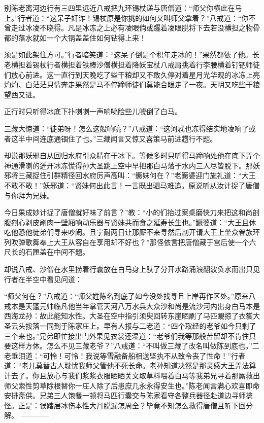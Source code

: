 \documentclass[12pt,UTF8]{ctexbook}
\begin{document}
别陈老离河边行有三四里远近八戒把九环锡杖递与唐僧道：“师父你横此在马上。”行者道：“这呆子奸诈！锡杖原是你挑的如何又叫师父拿着？”八戒道：“你不曾走过冰凌不晓得。凡是冰冻之上必有凌眼倘或躧着凌眼脱将下去若没横担之物骨都的落水就如一个大锅盖盖住如何钻得上来！

须是如此架住方可。”行者暗笑道：“这呆子倒是个积年走冰的！”果然都依了他。长老横担着锡杖行者横担着铁棒沙僧横担着降妖宝杖八戒肩挑着行李腰横着钉钯师徒们放心前进。这一直行到天晚吃了些干粮却又不敢久停对着星月光华观的冰冻上亮灼灼、白茫茫只情奔走果然是马不停蹄师徒们莫能合眼走了一夜。天明又吃些干粮望西又进。

正行时只听得冰底下扑喇喇一声响喨险些儿唬倒了白马。

三藏大惊道：“徒弟呀！怎么这般响喨？”八戒道：“这河忒也冻得结实地凌响了或者这半中间连底通锢住了也。”三藏闻言又惊又喜策马前进趱行不题。

却说那妖邪自从回归水府引众精在于冰下。等候多时只听得马蹄响处他在底下弄个神通滑喇的迸开冰冻慌得孙大圣跳上空中早把那白马落于水内三人尽皆脱下。那妖邪将三藏捉住引群精径回水府厉声高叫：“鳜妹何在？”老鳜婆迎门施礼道：“大王不敢不敢！”妖邪道：“贤妹何出此言！一言既出驷马难追。原说听从汝计捉了唐僧与你拜为兄妹。

今日果成妙计捉了唐僧就好味了前言？”教：“小的们抬过案桌磨快刀来把这和尚剖腹剜心剥皮剐肉一壁厢响动乐器与贤妹共而食之延寿长生也。”鳜婆道：“大王且休吃他恐他徒弟们寻来吵闹。且宁耐两日让那厮不来寻然后剖开请大王上坐众眷族环列吹弹歌舞奉上大王从容自在享用却不好也？”那怪依言把唐僧藏于宫后使一个六尺长的石匣盖在中间不题。

却说八戒、沙僧在水里捞着行囊放在白马身上驮了分开水路涌浪翻波负水而出只见行者在半空中看见问道：

“师父何在？”八戒道：“师父姓陈名到底了如今没处找寻且上岸再作区处。”原来八戒本是天蓬元帅临凡他当年掌管天河八万水兵大众沙和尚是流沙河内出身白马本是西海龙孙：故此能知水性。大圣在空中指引须臾回转东崖晒刷了马匹靦掠了衣裳大圣云头按落一同到于陈家庄上。早有人报与二老道：“四个取经的老爷如今只剩了三个来也。”兄弟即忙接出门外果见衣裳还湿道：“老爷们我等那般苦留却不肯住只要这样方休。怎么不见三藏老爷？”八戒道：“不叫做三藏了改名叫做陈到底也。”二老垂泪道：“可怜！可怜！我说等雪融备船相送坚执不从致令丧了性命！”行者道：“老儿莫替古人耽忧我师父管他不死长命。老孙知道决然是那灵感大王弄法算计去了。你且放心与我们浆浆衣服晒晒关文取草料喂着白马等我弟兄寻着那厮救出师父索性剪草除根替你一庄人除了后患庶几永永得安生也。”陈老闻言满心欢喜即命安排斋供。兄弟三人饱餐一顿将马匹行囊交与陈家看守各整兵器径赴道边寻师擒怪。正是：误踏层冰伤本性大丹脱漏怎周全？毕竟不知怎么救得唐僧且听下回分解。
------------
\end{document}
